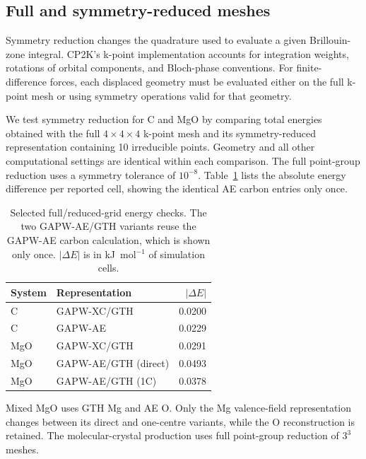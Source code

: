 \documentclass[10pt,a4paper]{article}
\begin{document}
\FloatBarrier

\subsection{Full and symmetry-reduced meshes}
\label{sec:symmetry-meshes}

Symmetry reduction changes the quadrature used to evaluate a given Brillouin-zone integral. CP2K's k-point implementation accounts for integration weights, rotations of orbital components, and Bloch-phase conventions.\cite{CP2KDynamics2026,Alizadeh2026PeriodicGFN2} For finite-difference forces, each displaced geometry must be evaluated either on the full k-point mesh or using symmetry operations valid for that geometry.

We test symmetry reduction for C and MgO by comparing total energies obtained with the full $4\times4\times4$ k-point mesh and its symmetry-reduced representation containing 10 irreducible points. Geometry and all other computational settings are identical within each comparison. The full point-group reduction uses a symmetry tolerance of $10^{-8}$. Table~\ref{tab:symmetry} lists the absolute energy difference per reported cell, showing the identical AE carbon entries only once.

\begin{table}[htbp]
\centering
\caption{Selected full/reduced-grid energy checks. The two GAPW-AE/GTH variants reuse the GAPW-AE carbon calculation, which is shown only once. $|\Delta E|$ is in kJ~mol$^{-1}$ of simulation cells.}
\label{tab:symmetry}
\begin{tabular}{llr}
\toprule
System & Representation & $|\Delta E|$\\
\midrule
C & GAPW-XC/GTH & 0.0200\\
C & GAPW-AE & 0.0229\\
MgO & GAPW-XC/GTH & 0.0291\\
MgO & GAPW-AE/GTH (direct) & 0.0493\\
MgO & GAPW-AE/GTH (1C) & 0.0378\\
\bottomrule
\end{tabular}
\end{table}

 Mixed MgO uses GTH Mg and AE O. Only the Mg valence-field representation changes between its direct and one-centre variants, while the O reconstruction is retained. The molecular-crystal production uses full point-group reduction of $3^3$ meshes.

\FloatBarrier
\end{document}
